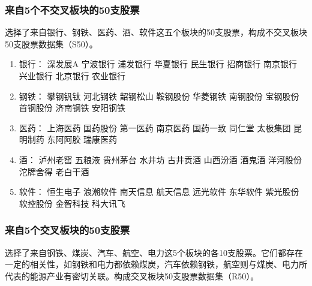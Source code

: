 \documentclass[12pt]{article}
\begin{document}
\subsubsection{来自5个不交叉板块的50支股票}
选择了来自银行、钢铁、医药、酒、软件这五个板块的50支股票，构成不交叉板块50支股票数据集（S50）。
\begin{multicols}{2}
\begin{enumerate}
\item 银行：
 深发展A
 宁波银行
 浦发银行
 华夏银行
 民生银行
 招商银行
 南京银行
 兴业银行
 北京银行
 农业银行
\item 钢铁：
 攀钢钒钛
 河北钢铁
 韶钢松山
 鞍钢股份
 华菱钢铁
 南钢股份
 宝钢股份
 首钢股份
 济南钢铁
 安阳钢铁
\item 医药：
 上海医药
 国药股份
 第一医药
 南京医药
 国药一致
 同仁堂
 太极集团
 昆明制药
 东阿阿胶
 瑞康医药
\item 酒：
 泸州老窖
 五粮液
 贵州茅台
 水井坊
 古井贡酒
 山西汾酒
 酒鬼酒
 洋河股份
 沱牌舍得
 老白干酒
\item 软件：
 恒生电子
 浪潮软件
 南天信息
 航天信息
 远光软件
 东华软件
 紫光股份
 软控股份
 金智科技
 科大讯飞
\end{enumerate}
\end{multicols}

\subsubsection{来自5个交叉板块的50支股票}
选择了来自钢铁、煤炭、汽车、航空、电力这5个板块的各10支股票。它们都存在一定的相关性，如钢铁和电力都依赖煤炭，汽车依赖钢铁，航空则与煤炭、电力所代表的能源产业有密切关联。构成交叉板块50支股票数据集（R50）。
\end{document}
